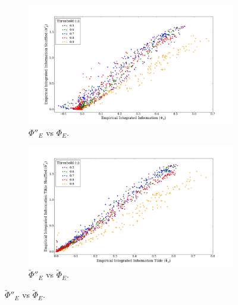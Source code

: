 \documentclass[a4paper,11pt]{article}
\begin{document}
\begin{figure}[H] 
	\label{fig:phi-vs-phi-shuffled} 
	\begin{minipage}[b]{0.5\linewidth}
		\begin{figure}[H]
		\begin{center}
		\includegraphics[scale = 0.2]{figures/phi_shuffled_vs_phi}
		\caption{
			$\Phi''_E$ vs $\Phi_E$.
			\label{fig:phi_shuffled_vs_phi}
		}
		\end{center}
		\end{figure}
		\vspace{2ex}
	\end{minipage}
	\begin{minipage}[b]{0.5\linewidth}
		\begin{figure}[H]
		\begin{center}
		\includegraphics[scale = 0.2]{figures/phi_tilde_shuffled_vs_phi_tilde}
		\caption{
			$\widetilde{\Phi}''_E$ vs $\widetilde{\Phi}_E$.
			\label{fig:phi_tilde_shuffled_vs_phi_tilde}
		}
		\end{center}
		\end{figure}
		\vspace{2ex}
	\end{minipage}
\end{figure}
\end{document}
